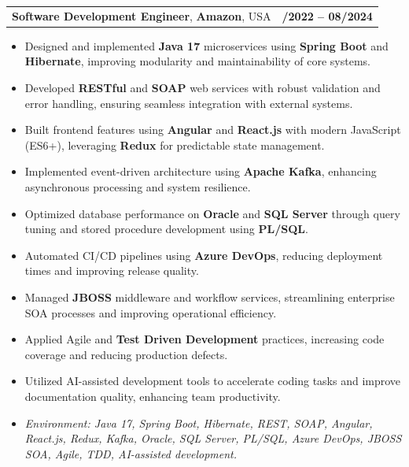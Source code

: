 \documentclass[letterpaper,11pt]{article}
\makeatletter
\newcommand{\resumeItem}[1]{
  \item\footnotesize{
    {#1 \vspace{-2pt}}
  }
}
\newcommand{\resumeSubheading}[4]{
  \vspace{-2pt}\item
    \begin{tabular*}{1.0\textwidth}[t]{l@{\extracolsep{\fill}}r}
      \textbf{\fontsize{10pt}{14pt}\selectfont #3}, \textbf{\fontsize{10pt}{14pt}\selectfont #1}, \fontsize{10pt}{14pt}\selectfont #4 & \textbf{\fontsize{10pt}{14pt}\selectfont #2} \\
    \end{tabular*}\vspace{-7pt}
}
\newcommand{\resumeItemListStart}{\begin{itemize}[leftmargin=*]}
\newcommand{\resumeItemListEnd}{\end{itemize}\vspace{-5pt}}
\makeatother
\begin{document}
\resumeSubheading
{Amazon}{10/2022 -- 08/2024}
{Software Development Engineer}{USA}
\resumeItemListStart
  \resumeItem{Designed and implemented \textbf{Java 17} microservices using \textbf{Spring Boot} and \textbf{Hibernate}, improving modularity and maintainability of core systems.}
  \resumeItem{Developed \textbf{RESTful} and \textbf{SOAP} web services with robust validation and error handling, ensuring seamless integration with external systems.}
  \resumeItem{Built frontend features using \textbf{Angular} and \textbf{React.js} with modern JavaScript (ES6+), leveraging \textbf{Redux} for predictable state management.}
  \resumeItem{Implemented event-driven architecture using \textbf{Apache Kafka}, enhancing asynchronous processing and system resilience.}
  \resumeItem{Optimized database performance on \textbf{Oracle} and \textbf{SQL Server} through query tuning and stored procedure development using \textbf{PL/SQL}.}
  \resumeItem{Automated CI/CD pipelines using \textbf{Azure DevOps}, reducing deployment times and improving release quality.}
  \resumeItem{Managed \textbf{JBOSS} middleware and workflow services, streamlining enterprise SOA processes and improving operational efficiency.}
  \resumeItem{Applied Agile and \textbf{Test Driven Development} practices, increasing code coverage and reducing production defects.}
  \resumeItem{Utilized AI-assisted development tools to accelerate coding tasks and improve documentation quality, enhancing team productivity.}
  \resumeItem{\textit{Environment: Java 17, Spring Boot, Hibernate, REST, SOAP, Angular, React.js, Redux, Kafka, Oracle, SQL Server, PL/SQL, Azure DevOps, JBOSS SOA, Agile, TDD, AI-assisted development.}}
\resumeItemListEnd
\end{document}
